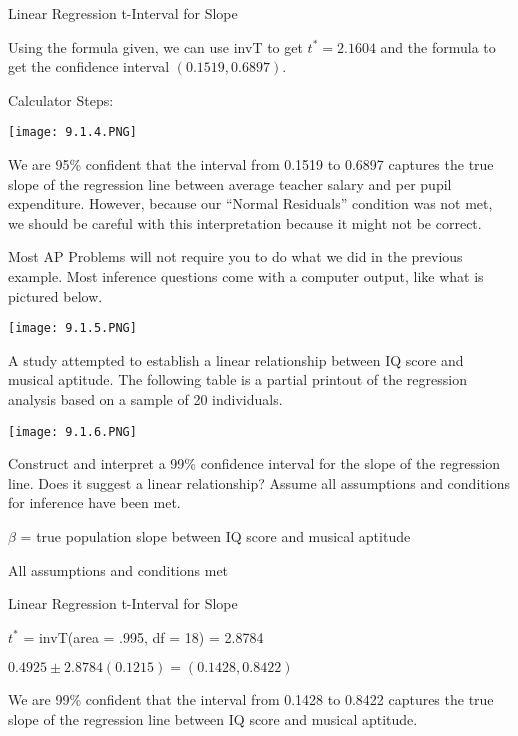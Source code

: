 \documentclass[../stats.tex]{subfiles}
\begin{document}
\begin{example}
    Linear Regression t-Interval for Slope 

    Using the formula given, we can use invT to get $t^*=2.1604$ and the formula to get the confidence interval $(0.1519, 0.6897)$.

    Calculator Steps:
    \begin{center}
        \texttt{[image: 9.1.4.PNG]}
    \end{center}

    We are 95\% confident that the interval from 0.1519 to 0.6897 captures the true slope of the regression line between average teacher salary and per pupil expenditure. However, because our 
    ``Normal Residuals'' condition was not met, we should be careful with this interpretation because it might not be correct.
\end{example}

Most AP Problems will not require you to do what we did in the previous example. Most inference questions come with a computer output, like what is pictured below.
\begin{center}
    \texttt{[image: 9.1.5.PNG]}
\end{center}

\begin{example}
    A study attempted to establish a linear relationship between IQ score and musical aptitude. The following table is a partial printout of the regression analysis based on a sample of 20 individuals.
    \begin{center}
        \texttt{[image: 9.1.6.PNG]}
    \end{center}

    Construct and interpret a 99\% confidence interval for the slope of the regression line. Does it suggest a linear relationship? Assume all assumptions and conditions for inference have been met.

    $\beta$ = true population slope between IQ score and musical aptitude

    All assumptions and conditions met 

    Linear Regression t-Interval for Slope 

    $t^*$ = invT(area = .995, df = 18) = 2.8784

    $0.4925\pm 2.8784(0.1215) = (0.1428, 0.8422)$

    We are 99\% confident that the interval from 0.1428 to 0.8422 captures the true slope of the regression line between IQ score and musical aptitude.
\end{example}
\end{document}

